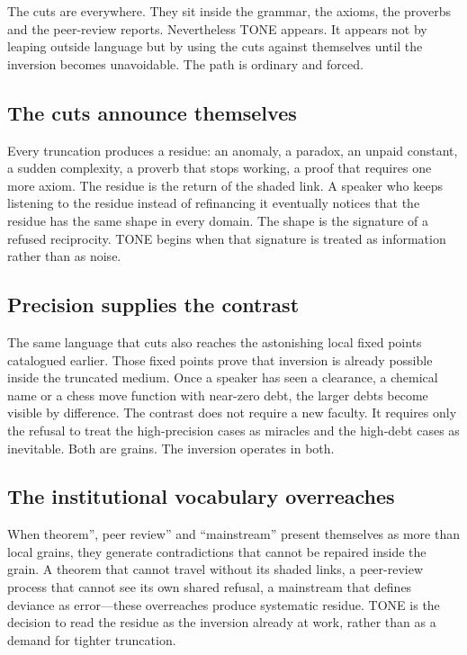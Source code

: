 \documentclass[11pt,a4paper]{article}
\begin{document}
The cuts are everywhere. They sit inside the grammar, the axioms, the proverbs and the peer-review reports. Nevertheless TONE appears. It appears not by leaping outside language but by using the cuts against themselves until the inversion becomes unavoidable. The path is ordinary and forced.

\subsection{The cuts announce themselves} Every truncation produces a residue: an anomaly, a paradox, an unpaid constant, a sudden complexity, a proverb that stops working, a proof that requires one more axiom. The residue is the return of the shaded link. A speaker who keeps listening to the residue instead of refinancing it eventually notices that the residue has the same shape in every domain. The shape is the signature of a refused reciprocity. TONE begins when that signature is treated as information rather than as noise.

\subsection{Precision supplies the contrast} The same language that cuts also reaches the astonishing local fixed points catalogued earlier. Those fixed points prove that inversion is already possible inside the truncated medium. Once a speaker has seen a clearance, a chemical name or a chess move function with near-zero debt, the larger debts become visible by difference. The contrast does not require a new faculty. It requires only the refusal to treat the high-precision cases as miracles and the high-debt cases as inevitable. Both are grains. The inversion operates in both.

\subsection{The institutional vocabulary overreaches} When theorem'', peer review'' and ``mainstream'' present themselves as more than local grains, they generate contradictions that cannot be repaired inside the grain. A theorem that cannot travel without its shaded links, a peer-review process that cannot see its own shared refusal, a mainstream that defines deviance as error—these overreaches produce systematic residue. TONE is the decision to read the residue as the inversion already at work, rather than as a demand for tighter truncation.
\end{document}
